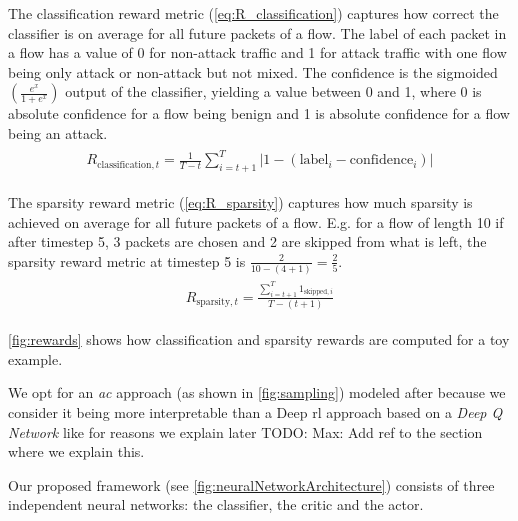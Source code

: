 \documentclass[conference]{IEEEtran}
\newcommand\note[2]{{\color{#1}#2}}
\newcommand\todo[1]{{\note{red}{TODO: #1}}}
\begin{document}
The classification reward metric (\autoref{eq:R_classification}) captures how correct the classifier is on average for all future packets of a flow. The label of each packet in a flow has a value of 0 for non-attack traffic and 1 for attack traffic with one flow being only attack or non-attack but not mixed. The confidence is the sigmoided $\left(\frac{e^x}{1+e^x}\right)$ output of the classifier, yielding a value between 0 and 1, where 0 is absolute confidence for a flow being benign and 1 is absolute confidence for a flow being an attack.
\begin{align}
\begin{split}
R_{\text{classification},t} = \frac{1}{T-t} \sum_{i=t+1}^{T} |1 - \left(\text{label}_i - \text{confidence}_i\right)|
\end{split}
\label{eq:R_classification}
\end{align}

The sparsity reward metric (\autoref{eq:R_sparsity}) captures how much sparsity is achieved on average for all future packets of a flow. E.g. for a flow of length 10 if after timestep 5, 3 packets are chosen and 2 are skipped from what is left, the sparsity reward metric at timestep 5 is $\frac{2}{10-(4+1)}=\frac{2}{5}$.
\begin{align}
\begin{split}
R_{\text{sparsity},t} = \frac{\sum_{i=t+1}^{T} 1_{\text{skipped},i}}{T-(t+1)}
\end{split}
\label{eq:R_sparsity}
\end{align}

\autoref{fig:rewards} shows how classification and sparsity rewards are computed for a toy example.

We opt for an \emph{\gls{ac}} approach (as shown in \autoref{fig:sampling}) modeled after \cite{mnih_asynchronous_2016} because we consider it being more interpretable than a Deep \gls{rl} approach based on a \textit{Deep Q Network} like \cite{mnih_playing_2013} for reasons we explain later \todo{Max: Add ref to the section where we explain this}.

Our proposed framework (see \autoref{fig:neuralNetworkArchitecture}) consists of three independent neural networks: the classifier, the critic and the actor.
\end{document}
